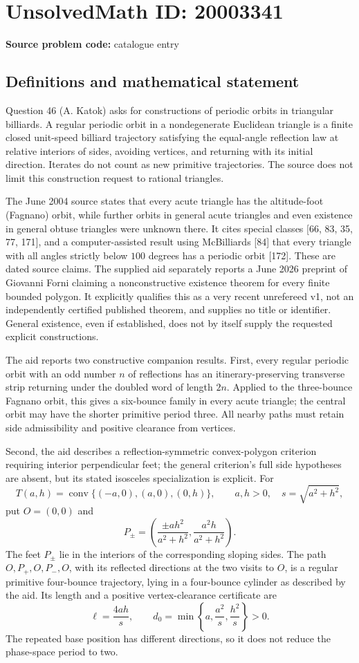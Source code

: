 \documentclass[11pt]{article}
\begin{document}
\section*{UnsolvedMath ID: 20003341}
\textbf{Source problem code:} catalogue entry
\subsection{Definitions and mathematical statement}
Question 46 (A. Katok) asks for constructions of periodic orbits in triangular billiards. A regular periodic orbit in a nondegenerate Euclidean triangle is a finite closed unit-speed billiard trajectory satisfying the equal-angle reflection law at relative interiors of sides, avoiding vertices, and returning with its initial direction. Iterates do not count as new primitive trajectories. The source does not limit this construction request to rational triangles.

The June 2004 source states that every acute triangle has the altitude-foot (Fagnano) orbit, while further orbits in general acute triangles and even existence in general obtuse triangles were unknown there. It cites special classes [66, 83, 35, 77, 171], and a computer-assisted result using McBilliards [84] that every triangle with all angles strictly below $100$ degrees has a periodic orbit [172]. These are dated source claims. The supplied aid separately reports a June 2026 preprint of Giovanni Forni claiming a nonconstructive existence theorem for every finite bounded polygon. It explicitly qualifies this as a very recent unrefereed v1, not an independently certified published theorem, and supplies no title or identifier. General existence, even if established, does not by itself supply the requested explicit constructions.

The aid reports two constructive companion results. First, every regular periodic orbit with an odd number $n$ of reflections has an itinerary-preserving transverse strip returning under the doubled word of length $2n$. Applied to the three-bounce Fagnano orbit, this gives a six-bounce family in every acute triangle; the central orbit may have the shorter primitive period three. All nearby paths must retain side admissibility and positive clearance from vertices.

Second, the aid describes a reflection-symmetric convex-polygon criterion requiring interior perpendicular feet; the general criterion's full side hypotheses are absent, but its stated isosceles specialization is explicit. For
\[
 T(a,h)=\operatorname{conv}\{(-a,0),(a,0),(0,h)\},\qquad a,h>0,
 \quad s=\sqrt{a^2+h^2},
\]
put $O=(0,0)$ and
\[
 P_\pm=\left(\frac{\pm ah^2}{a^2+h^2},\frac{a^2h}{a^2+h^2}\right).
\]
The feet $P_\pm$ lie in the interiors of the corresponding sloping sides. The path $O,P_+,O,P_-,O$, with its reflected directions at the two visits to $O$, is a regular primitive four-bounce trajectory, lying in a four-bounce cylinder as described by the aid. Its length and a positive vertex-clearance certificate are
\[
 \ell=\frac{4ah}{s},\qquad
 d_0=\min\left\{a,\frac{a^2}{s},\frac{h^2}{s}\right\}>0.
\]
The repeated base position has different directions, so it does not reduce the phase-space period to two.
\end{document}
